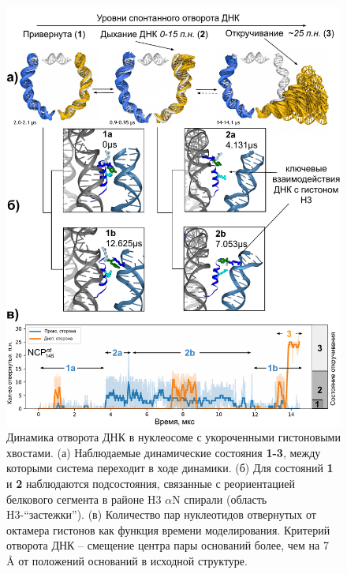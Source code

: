 \begin{figure} [H]
    \centering
    \includegraphics[width=\textwidth]{images/p2/10ms/fig2_new.pdf}
    \caption[Динамика отворота ДНК в нуклеосоме с укороченными гистоновыми хвостами]{Динамика отворота ДНК в нуклеосоме с укороченными гистоновыми хвостами. (а) Наблюдаемые динамические состояния \textbf{1-3}, между которыми система переходит в ходе динамики. (б) Для состояний \textbf{1} и \textbf{2} наблюдаются подсостояния, связанные с реориентацией белкового сегмента в районе H3 $\alpha$N спирали (область H3-``застежки''). (в) Количество пар нуклеотидов отвернутых от октамера гистонов как функция времени моделирования. Критерий отворота ДНК  --  смещение центра пары оснований более, чем на 7 \AA{} от положений оснований в исходной структуре. }
    \label{fig:p2_3:f2}
\end{figure}



